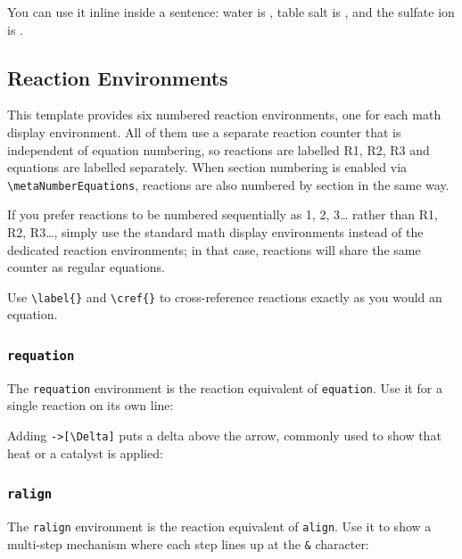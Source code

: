 You can use it inline inside a sentence: water is , table salt is , and the sulfate ion is .

\subsection{Reaction Environments}
This template provides six numbered reaction environments, one for each math display environment. All of them use a separate reaction counter that is independent of equation numbering, so reactions are labelled R1, R2, R3 and equations are labelled separately. When section numbering is enabled via \texttt{\textbackslash metaNumberEquations}, reactions are also numbered by section in the same way.

If you prefer reactions to be numbered sequentially as 1, 2, 3… rather than R1, R2, R3…, simply use the standard math display environments instead of the dedicated reaction environments; in that case, reactions will share the same counter as regular equations.

Use \texttt{\textbackslash label\{\}} and \texttt{\textbackslash cref\{\}} to cross-reference reactions exactly as you would an equation.

\subsubsection{\texttt{requation}}
The \texttt{requation} environment is the reaction equivalent of \texttt{equation}. Use it for a single reaction on its own line:

\begin{requation}
	\label{rxn:combustion}
\end{requation}

\begin{requation}
	\label{rxn:equilibrium}
\end{requation}

Adding \texttt{->[\textbackslash Delta]} puts a delta above the arrow, commonly used to show that heat or a catalyst is applied:

\begin{requation}
\end{requation}

\begin{requation}
	\label{rxn:heat}
\end{requation}

\subsubsection{\texttt{ralign}}
The \texttt{ralign} environment is the reaction equivalent of \texttt{align}. Use it to show a multi-step mechanism where each step lines up at the \texttt{\&} character:


